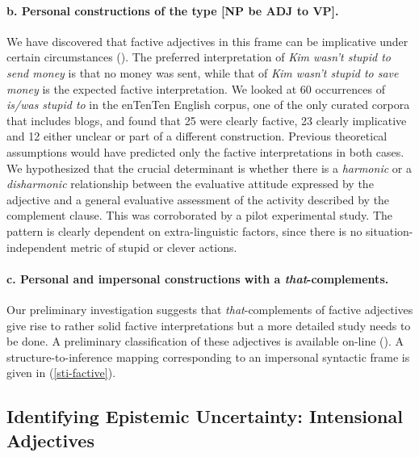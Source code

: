 \documentclass[10pt]{article}
\begin{document}
\paragraph{b. Personal constructions of the type [NP be ADJ to VP].}
We have discovered that factive adjectives in this frame can be implicative under certain circumstances (\cite{csli-gang-cssp13}). 
The preferred interpretation of \textit{Kim wasn't stupid to send money} is that no money was sent, while that of \textit{Kim wasn't stupid to save money} is the expected factive interpretation. We looked at 60 occurrences of \textit{is/was stupid to} in the enTenTen English corpus, one of the only curated corpora that includes blogs, and found that 25 were clearly factive, 23 clearly implicative and 12 either unclear or part of a different construction. Previous theoretical assumptions would have predicted only the factive interpretations in both cases. We hypothesized that the crucial determinant is whether there is a \emph{harmonic} or a \emph{disharmonic} relationship between the evaluative attitude expressed by the adjective and a general  evaluative assessment of the activity described by the complement clause.  
This  was corroborated by a pilot experimental study. The  pattern is clearly dependent on extra-linguistic factors, since there is no situation-independent metric of stupid or clever actions. 

\vspace{-.2in}
\paragraph{c. Personal and impersonal constructions with a \textit{that}-complements.} 
Our preliminary investigation suggests that \textit{that}-complements of factive adjectives give rise to rather solid factive interpretations but a more detailed study needs to be done.  A preliminary classification of these adjectives is available on-line (\cite{faust-adj-pol-lex}). A structure-to-inference mapping corresponding to an impersonal syntactic frame is given in (\ref{sti-factive}).
\vspace{-0.5em}
\vspace{-5mm}
\subsection{Identifying Epistemic Uncertainty: Intensional Adjectives}
\end{document}
